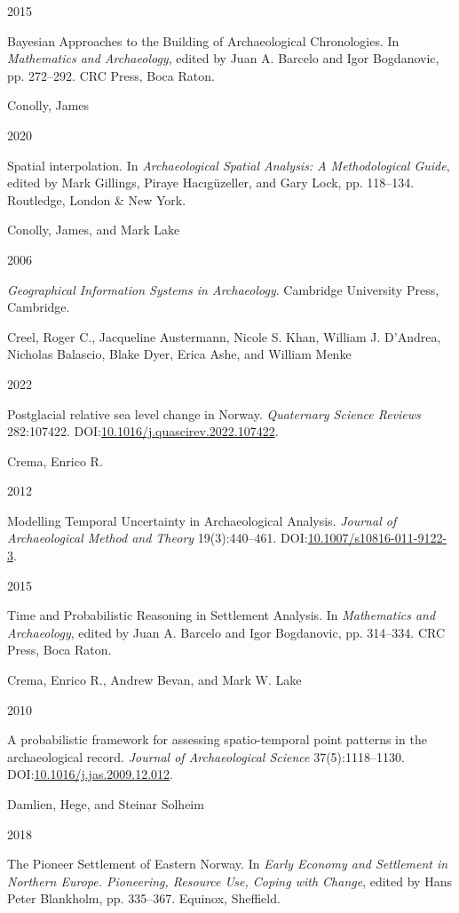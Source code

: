 \documentclass[
]{article}
\newlength{\cslhangindent}
\newlength{\csllabelwidth}
\newlength{\cslentryspacingunit} %
\newenvironment{CSLReferences}[2] %
 {%
  \setlength{\parindent}{0pt}
  \ifodd #1
  \let\oldpar\par
  \def\par{\hangindent=\cslhangindent\oldpar}
  \fi
  \setlength{\parskip}{#2\cslentryspacingunit}
 }%
 {}
\newcommand{\CSLBlock}[1]{#1\hfill\break}
\newcommand{\CSLLeftMargin}[1]{\parbox[t]{\csllabelwidth}{#1}}
\newcommand{\CSLRightInline}[1]{\parbox[t]{\linewidth - \csllabelwidth}{#1}\break}
\begin{document}
\begin{CSLReferences}{0}{0}
\leavevmode{}%
\CSLLeftMargin{ 2015 }
\CSLRightInline{{Bayesian Approaches to the Building of Archaeological Chronologies}. In \emph{{Mathematics and Archaeology}}, edited by Juan A. Barcelo and Igor Bogdanovic, pp. 272--292. CRC Press, Boca Raton.}

\leavevmode{}%
\CSLBlock{Conolly, James}
\CSLLeftMargin{ 2020}
\CSLRightInline{Spatial interpolation. In \emph{{Archaeological Spatial Analysis: A Methodological Guide}}, edited by Mark Gillings, Piraye Hacıgüzeller, and Gary Lock, pp. 118--134. Routledge, London \& New York.}

\leavevmode{}%
\CSLBlock{Conolly, James, and Mark Lake}
\CSLLeftMargin{ 2006}
\CSLRightInline{\emph{{Geographical Information Systems in Archaeology}}. Cambridge University Press, Cambridge.}

\leavevmode{}%
\CSLBlock{Creel, Roger C., Jacqueline Austermann, Nicole S. Khan, William J. D'Andrea, Nicholas Balascio, Blake Dyer, Erica Ashe, and William Menke}
\CSLLeftMargin{ 2022}
\CSLRightInline{Postglacial relative sea level change in Norway. \emph{Quaternary Science Reviews} 282:107422. DOI:\href{https://doi.org/10.1016/j.quascirev.2022.107422}{10.1016/j.quascirev.2022.107422}.}

\leavevmode{}%
\CSLBlock{Crema, Enrico R.}
\CSLLeftMargin{ 2012}
\CSLRightInline{Modelling Temporal Uncertainty in Archaeological Analysis. \emph{Journal of Archaeological Method and Theory} 19(3):440--461. DOI:\href{https://doi.org/10.1007/s10816-011-9122-3}{10.1007/s10816-011-9122-3}.}

\leavevmode{}%
\CSLLeftMargin{ 2015 }
\CSLRightInline{{Time and Probabilistic Reasoning in Settlement Analysis}. In \emph{{Mathematics and Archaeology}}, edited by Juan A. Barcelo and Igor Bogdanovic, pp. 314--334. CRC Press, Boca Raton.}

\leavevmode{}%
\CSLBlock{Crema, Enrico R., Andrew Bevan, and Mark W. Lake}
\CSLLeftMargin{ 2010}
\CSLRightInline{A probabilistic framework for assessing spatio-temporal point patterns in the archaeological record. \emph{Journal of Archaeological Science} 37(5):1118--1130. DOI:\href{https://doi.org/10.1016/j.jas.2009.12.012}{10.1016/j.jas.2009.12.012}.}

\leavevmode{}%
\CSLBlock{Damlien, Hege, and Steinar Solheim}
\CSLLeftMargin{ 2018}
\CSLRightInline{{The Pioneer Settlement of Eastern Norway}. In \emph{{Early Economy and Settlement in Northern Europe. Pioneering, Resource Use, Coping with Change}}, edited by Hans Peter Blankholm, pp. 335--367. Equinox, Sheffield.}


\end{CSLReferences}
\end{document}
